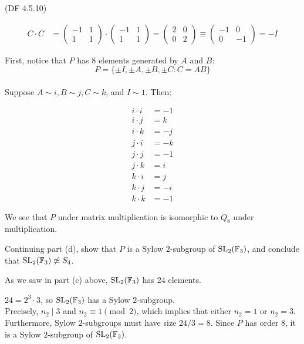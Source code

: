 \begin{problem}{(\textsf{DF 4.5.10})}
\begin{enumalph}
\begin{Answer}
\begin{align*}
          C \cdot C &= \begin{pmatrix} -1 & 1 \\ 1 & 1 \end{pmatrix}
          \cdot \begin{pmatrix} -1 & 1 \\ 1 & 1 \end{pmatrix}
          = \begin{pmatrix} 2 & 0 \\ 0 & 2 \end{pmatrix}
          \equiv \begin{pmatrix} -1 & 0 \\ 0 & -1 \end{pmatrix} = -I
        \end{align*}

        \noindent
        First, notice that $P$ has $8$ elements generated by $A$ and $B$:
        \[P = \{\pm I, \pm A, \pm B, \pm C \colon C = AB\}\]\\
        Suppose $A \sim i, B \sim j, C \sim k$, and $I \sim 1$.
        Then:

        \begin{align*}
          i \cdot i &= -1 \\
          i \cdot j &= k \\
          i \cdot k &= -j \\
          j \cdot i &= -k \\
          j \cdot j &= -1 \\
          j \cdot k &= i \\
          k \cdot i &= j \\
          k \cdot j &= -i \\
          k \cdot k &= -1
        \end{align*}

      We see that $P$ under matrix multiplication is isomorphic to $Q_8$
      under multiplication.
        
      \end{Answer}
    \newpage
    \item Continuing part (d), show that $P$ is a Sylow $2$-subgroup of $\operatorname{SL}_2(\mathbb{F}_3)$,
      and conclude that $\operatorname{SL}_2(\mathbb{F}_3) \not\simeq S_4$.

      \begin{Answer}
        As we saw in part (c) above, $\operatorname{SL}_2(\mathbb{F}_3)$ has $24$ elements.

        \noindent
        $24 = 2^3 \cdot 3$, so $\operatorname{SL}_2(\mathbb{F}_3)$ has a Sylow $2$-subgroup.\\
        Precisely, $n_2 \mid 3$ and $n_2 \equiv 1 \pmod 2$, which implies that
        either $n_2 = 1$ or $n_2 = 3$. Furthermore, Sylow $2$-subgroups
        must have size $24/3 = 8$.
        Since $P$ has order $8$, it is a Sylow $2$-subgroup of $\operatorname{SL}_2(\mathbb{F}_3)$.


\end{Answer}
\end{enumalph}
\end{problem}
